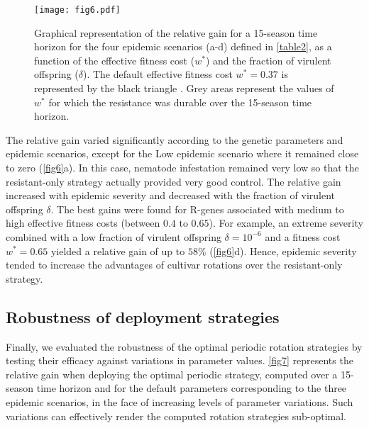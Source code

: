 {{{{\begin{figure}[htp]
  \centering
   \texttt{[image: fig6.pdf]} 
  \caption[Graphical representation of the relative gain for a
    15-season time horizon as function of epidemic scenarios]{Graphical representation of the relative gain for a
    15-season time horizon for the four epidemic scenarios
    (a-d) defined in \autoref{table2}, as a function of the effective
    fitness cost ($w^*$) and the fraction of virulent offspring
    ($\delta$). The default effective fitness cost $w^*=0.37$ is
    represented by the black triangle 
    \citep{Castagnone-Sereno2007}. Grey areas represent the values of
    $w^*$ for which the resistance was durable over the 15-season time
    horizon.}
  \label{fig6}
\end{figure}

The relative gain varied significantly according to the genetic
parameters and epidemic scenarios, except for the 
{Low epidemic scenario} where it remained close to zero
(\autoref{fig6}a). In this case, nematode infestation remained
very low so that the resistant-only strategy actually provided very
good control. The relative gain increased with {epidemic severity}
and decreased with the fraction of virulent offspring $\delta$. The
best gains were found for R-genes associated with medium to high
effective fitness costs (between $0.4$ to $0.65$). For example, an
extreme {severity} combined with a low fraction of
virulent offspring $\delta=10^{-6}$ and a fitness cost $w^*=0.65$
yielded a relative gain of up to $58\%$
(\autoref{fig6}d). Hence, {epidemic severity} tended to
increase the advantages of cultivar rotations over the resistant-only
strategy.

\subsection{Robustness of deployment strategies}

Finally, we evaluated the robustness of the optimal periodic rotation
strategies by testing their efficacy against variations in parameter
values.  \autoref{fig7} represents the relative gain when deploying
the optimal periodic strategy, computed over a 15-season time horizon
and for the default parameters corresponding to the three epidemic
scenarios, in the face of increasing levels of parameter variations.
Such variations can effectively render the computed rotation
strategies sub-optimal.

}}}}
